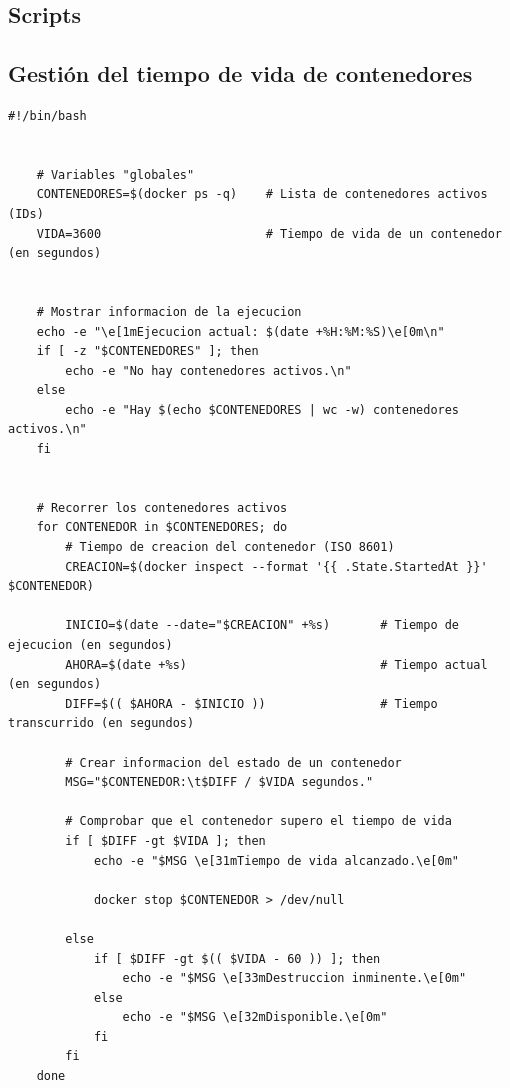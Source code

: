 \begin{appendices}

    \chapter{Scripts}

        \section{Gestión del tiempo de vida de contenedores}

            \begin{lstlisting}[style=bash_style, basicstyle=\ttfamily\scriptsize]
    #!/bin/bash


    # Variables "globales"
    CONTENEDORES=$(docker ps -q)    # Lista de contenedores activos (IDs)
    VIDA=3600                       # Tiempo de vida de un contenedor (en segundos)
    
    
    # Mostrar informacion de la ejecucion
    echo -e "\e[1mEjecucion actual: $(date +%H:%M:%S)\e[0m\n"
    if [ -z "$CONTENEDORES" ]; then
        echo -e "No hay contenedores activos.\n"
    else
        echo -e "Hay $(echo $CONTENEDORES | wc -w) contenedores activos.\n"
    fi
    
    
    # Recorrer los contenedores activos
    for CONTENEDOR in $CONTENEDORES; do
        # Tiempo de creacion del contenedor (ISO 8601)
        CREACION=$(docker inspect --format '{{ .State.StartedAt }}' $CONTENEDOR)
    
        INICIO=$(date --date="$CREACION" +%s)       # Tiempo de ejecucion (en segundos)
        AHORA=$(date +%s)                           # Tiempo actual (en segundos)
        DIFF=$(( $AHORA - $INICIO ))                # Tiempo transcurrido (en segundos)
    
        # Crear informacion del estado de un contenedor
        MSG="$CONTENEDOR:\t$DIFF / $VIDA segundos."
    
        # Comprobar que el contenedor supero el tiempo de vida
        if [ $DIFF -gt $VIDA ]; then
            echo -e "$MSG \e[31mTiempo de vida alcanzado.\e[0m"
            
            docker stop $CONTENEDOR > /dev/null
    
        else
            if [ $DIFF -gt $(( $VIDA - 60 )) ]; then
                echo -e "$MSG \e[33mDestruccion inminente.\e[0m"
            else
                echo -e "$MSG \e[32mDisponible.\e[0m"
            fi
        fi
    done
    

\end{lstlisting}
\end{appendices}
